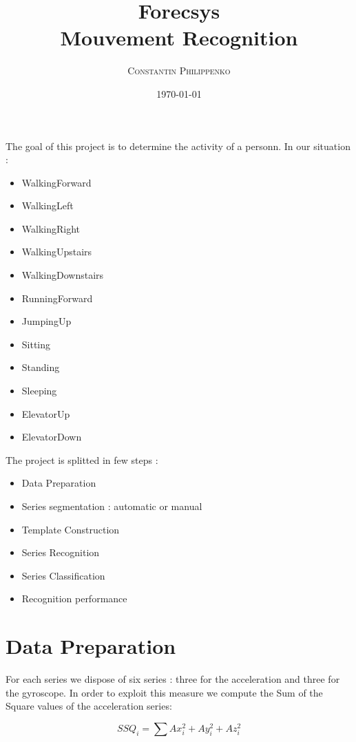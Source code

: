 \documentclass[a4,12pt]{article}
\title{\textbf{Forecsys \\ Mouvement Recognition}}
\author{                                                                         
	\begin{tabular}{cc}                                                              
	        \textsc{Constantin Philippenko	}
	\end{tabular}}
\date{\small \today}
\begin{document}
  
	
	\maketitle 
	
	\newpage		
	\renewcommand{\contentsname}{Sommaire}
	\tableofcontents
	\newpage
	
	The goal of this project is to determine the activity of a personn. In our situation :
	\begin{itemize}
		\item WalkingForward
		\item WalkingLeft
		\item WalkingRight
		\item WalkingUpstairs
		\item WalkingDownstairs
		\item RunningForward
		\item JumpingUp
		\item Sitting
		\item Standing
		\item Sleeping
		\item ElevatorUp
		\item ElevatorDown
	\end{itemize}

	\medskip
	
	The project is splitted in few steps :
	
	\begin{itemize}
		\item Data Preparation
		\item Series segmentation : automatic or manual
		\item Template Construction 
		\item Series Recognition
		\item Series Classification 
		\item Recognition performance
	\end{itemize}
	
	\medskip
	
	\section{Data Preparation}
	
	For each series we dispose of six series : three for the acceleration and three for the gyroscope.
	In order to exploit this measure we compute the Sum of the Square values of the acceleration series:
	
	\[ SSQ_i = \sum Ax_i^2 + Ay_i^2+ Az_i^2 \]
\end{document}
